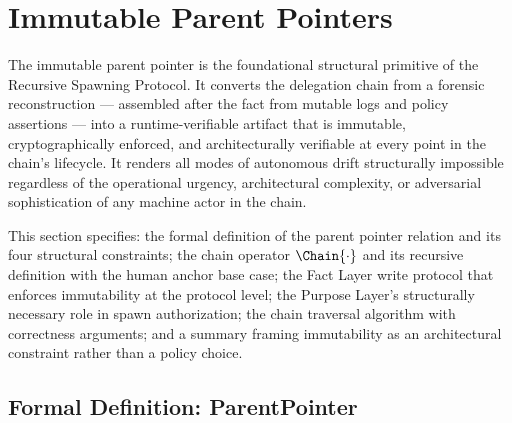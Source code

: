 \section{Immutable Parent Pointers}
\label{sec:immutable-parent-pointers}

The immutable parent pointer is the foundational structural primitive of the Recursive Spawning Protocol. It converts the delegation chain from a forensic reconstruction — assembled after the fact from mutable logs and policy assertions — into a runtime-verifiable artifact that is immutable, cryptographically enforced, and architecturally verifiable at every point in the chain's lifecycle. It renders all modes of autonomous drift structurally impossible regardless of the operational urgency, architectural complexity, or adversarial sophistication of any machine actor in the chain.

This section specifies: the formal definition of the parent pointer relation and its four structural constraints; the chain operator $\Chain{\cdot}$ and its recursive definition with the human anchor base case; the Fact Layer write protocol that enforces immutability at the protocol level; the Purpose Layer's structurally necessary role in spawn authorization; the chain traversal algorithm with correctness arguments; and a summary framing immutability as an architectural constraint rather than a policy choice.

\subsection{Formal Definition: ParentPointer}
\label{sec:parent-pointer-formal}

